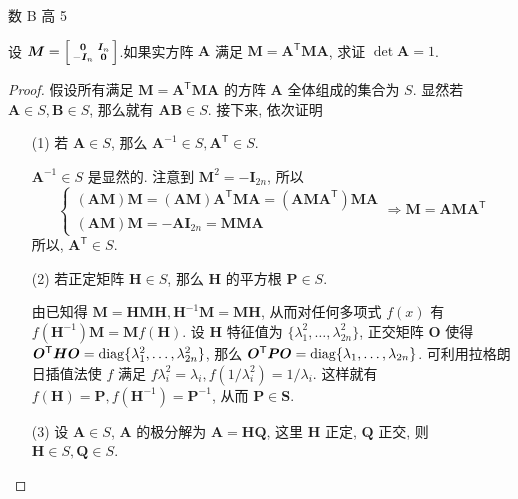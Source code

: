 \documentclass[a4paper, 12pt, UTF8]{ctexart}
\begin{document}
{\color{GoogleGreen} 数 B 高 5

}

\clearpage
\begin{exa}
    设 $\boldsymbol{M} =\Bigl[
    \begin{smallmatrix}
        \bm{0} & \bm{I}_{n}\\
        -\bm{I}_{n} & \bm{0}
    \end{smallmatrix}\Bigr]
$.如果实方阵 $\boldsymbol{A}$ 满足 $\boldsymbol{M}=\boldsymbol{A}^{\mathsf{T}}\boldsymbol{MA}$, 求证 $\det \boldsymbol{A} = 1$.
\end{exa}
{\color{GoogleRed}
  \begin{proof}
      假设所有满足 $\boldsymbol{M}=\boldsymbol{A}^{\mathsf{T}}\boldsymbol{MA}$ 的方阵 $\boldsymbol{A}$ 全体组成的集合为 $S$. 显然若 $\boldsymbol{A} \in S,  \boldsymbol{B} \in S$, 那么就有 $\boldsymbol{AB}\in S$. 接下来, 依次证明
      \begin{itemize}
          \item[(1)] 若 $\boldsymbol{A} \in S$, 那么 $\boldsymbol{A}^{-1} \in S, \boldsymbol{A}^{\mathsf T} \in S$.

          $\boldsymbol{A}^{-1} \in S$ 是显然的. 注意到 $\boldsymbol{M}^{2} = -\boldsymbol{I}_{2n}$, 所以
          \[
              \begin{cases}
                 (\boldsymbol{AM})\boldsymbol{M}  = (\boldsymbol{AM})\boldsymbol{A}^{\mathsf T}\boldsymbol{MA} =  (\boldsymbol{AMA}^{\mathsf T})\boldsymbol{MA}\\
                  (\boldsymbol{AM})\boldsymbol{M} = -\boldsymbol{AI}_{2n} = \boldsymbol{MMA} 
              \end{cases} \Longrightarrow \boldsymbol{M} = \boldsymbol{AMA}^{\mathsf T}
          \]
          所以, $\boldsymbol{A}^{\mathsf T} \in S$.
          \item[(2)] 若正定矩阵 $\boldsymbol{H} \in S$, 那么 $\boldsymbol{H}$ 的平方根 $\boldsymbol{P} \in S$.

          由已知得 $\boldsymbol{M} = \boldsymbol{HMH}, \boldsymbol{H}^{-1}\boldsymbol{M} = \boldsymbol{MH}$, 从而对任何多项式 $f(x)$ 有 $f(\boldsymbol{H}^{-1})\boldsymbol{M} = \boldsymbol{M}f(\boldsymbol{H})$. 设 $\boldsymbol{H}$ 特征值为 $\{ \lambda_{1}^{2}, \dots, \lambda_{2n}^{2} \}$, 正交矩阵 $\boldsymbol{O}$ 使得 $\boldsymbol{O}^{\mathsf T}\boldsymbol{HO} = {\rm diag}\{ \lambda_{1}^{2}, \dots, \lambda_{2n}^{2} \}$, 那么 $\boldsymbol{O}^{\mathsf T}\boldsymbol{PO} = {\rm diag}\{ \lambda_{1}, \dots, \lambda_{2n} \}$. 可利用拉格朗日插值法使 $f$ 满足 $f{\lambda_{i}^{2}} = \lambda_{i}, f(1/\lambda_{i}^{2})=1/\lambda_{i}$. 这样就有 $f(\boldsymbol{H}) = \boldsymbol{P}, f(\boldsymbol{H}^{-1}) = \boldsymbol{P}^{-1}$, 从而 $\boldsymbol{P} \in \boldsymbol{S}$.
          \item[(3)] 设 $\boldsymbol{A} \in S$, $\boldsymbol{A}$ 的极分解为 $\boldsymbol{A} = \boldsymbol{HQ}$, 这里 $\boldsymbol{H}$ 正定, $\boldsymbol{Q}$ 正交, 则 $\boldsymbol{H}\in S, \boldsymbol{Q}\in S$.


\end{itemize}
\end{proof}}
\end{document}
